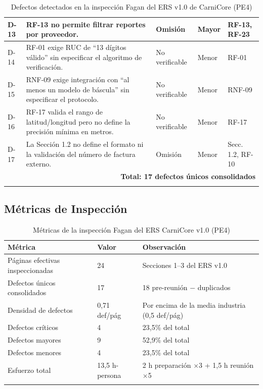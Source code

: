 \documentclass[11pt,a4paper]{article}
\begin{document}
\begin{longtable}{|p{0.8cm}|p{4.9cm}|p{2.2cm}|p{1.8cm}|p{2.2cm}|}
\hline
D-13 & RF-13 no permite filtrar reportes por proveedor. & Omisión & Mayor & RF-13, RF-23 \\
\hline
D-14 & RF-01 exige RUC de ``13 dígitos válido'' sin especificar el algoritmo de verificación. & No verificable & Menor & RF-01 \\
\hline
D-15 & RNF-09 exige integración con ``al menos un modelo de báscula'' sin especificar el protocolo. & No verificable & Menor & RNF-09 \\
\hline
D-16 & RF-17 valida el rango de latitud/longitud pero no define la precisión mínima en metros. & No verificable & Menor & RF-17 \\
\hline
D-17 & La Sección 1.2 no define el formato ni la validación del número de factura externo. & Omisión & Menor & Secc. 1.2, RF-10 \\
\hline
\multicolumn{5}{|r|}{\textbf{Total: 17 defectos únicos consolidados}} \\
\hline
\caption{Defectos detectados en la inspección Fagan del ERS v1.0 de CarniCore (PE4)}
\label{tab:defectos_fagan}
\end{longtable}

\subsection{Métricas de Inspección}

\begin{longtable}{|p{6cm}|p{2.5cm}|p{5.5cm}|}
\hline
\textbf{Métrica} & \textbf{Valor} & \textbf{Observación} \\
\hline
Páginas efectivas inspeccionadas & 24 & Secciones 1--3 del ERS v1.0 \\
\hline
Defectos únicos consolidados & 17 & 18 pre-reunión $-$ duplicados \\
\hline
Densidad de defectos & 0,71 def/pág & Por encima de la media industria (0,5 def/pág) \cite{wohlin2012} \\
\hline
Defectos críticos & 4 & 23,5\% del total \\
\hline
Defectos mayores & 9 & 52,9\% del total \\
\hline
Defectos menores & 4 & 23,5\% del total \\
\hline
Esfuerzo total & 13,5 h-persona & 2 h preparación $\times$3 + 1,5 h reunión $\times$5 \\
\hline
\caption{Métricas de la inspección Fagan del ERS CarniCore v1.0 (PE4)}
\label{tab:metricas_inspeccion}
\end{longtable}
\end{document}
